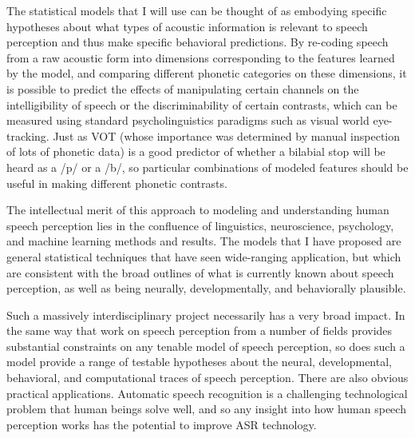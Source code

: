 \documentclass[12pt]{article}
\begin{document}
The statistical models that I will use can be thought of as embodying specific hypotheses about what types of acoustic information is relevant to speech perception and thus make specific behavioral predictions.  By re-coding speech from a raw acoustic form into dimensions corresponding to the features learned by the model, and comparing different phonetic categories on these dimensions, it is possible to predict the effects of manipulating certain channels on the intelligibility of speech or the discriminability of certain contrasts, which can be measured using standard psycholinguistics paradigms such as visual world eye-tracking.  Just as VOT (whose importance was determined by manual inspection of lots of phonetic data) is a good predictor of whether a bilabial stop will be heard as a /p/ or a /b/, so particular combinations of modeled features should be useful in making different phonetic contrasts.

The intellectual merit of this approach to modeling and understanding human speech perception lies in the confluence of linguistics, neuroscience, psychology, and machine learning methods and results.  The models that I have proposed are general statistical techniques that have seen wide-ranging application, but which are consistent with the broad outlines of what is currently known about speech perception, as well as being neurally, developmentally, and behaviorally plausible.

Such a massively interdisciplinary project necessarily has a very broad impact.  In the same way that work on speech perception from a number of fields provides substantial constraints on any tenable model of speech perception, so does such a model provide a range of testable hypotheses about the neural, developmental, behavioral, and computational traces of speech perception.  There are also obvious practical applications.  Automatic speech recognition is a challenging technological problem that human beings solve well, and so any insight into how human speech perception works has the potential to improve ASR technology.  



\end{document}

